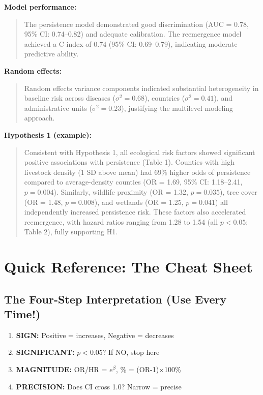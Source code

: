 \documentclass[11pt,a4paper]{article}
\begin{document}
\textbf{Model performance:}
\begin{quote}
The persistence model demonstrated good discrimination (AUC = 0.78, 95\% CI: 0.74--0.82) and adequate calibration. The reemergence model achieved a C-index of 0.74 (95\% CI: 0.69--0.79), indicating moderate predictive ability.
\end{quote}

\textbf{Random effects:}
\begin{quote}
Random effects variance components indicated substantial heterogeneity in baseline risk across diseases ($\sigma^2 = 0.68$), countries ($\sigma^2 = 0.41$), and administrative units ($\sigma^2 = 0.23$), justifying the multilevel modeling approach.
\end{quote}

\textbf{Hypothesis 1 (example):}
\begin{quote}
Consistent with Hypothesis 1, all ecological risk factors showed significant positive associations with persistence (Table 1). Counties with high livestock density (1 SD above mean) had 69\% higher odds of persistence compared to average-density counties (OR = 1.69, 95\% CI: 1.18--2.41, $p = 0.004$). Similarly, wildlife proximity (OR = 1.32, $p = 0.035$), tree cover (OR = 1.48, $p = 0.008$), and wetlands (OR = 1.25, $p = 0.041$) all independently increased persistence risk. These factors also accelerated reemergence, with hazard ratios ranging from 1.28 to 1.54 (all $p < 0.05$; Table 2), fully supporting H1.
\end{quote}

\section{Quick Reference: The Cheat Sheet}

\subsection{The Four-Step Interpretation (Use Every Time!)}

\begin{enumerate}
    \item \textbf{SIGN:} Positive = increases, Negative = decreases
    \item \textbf{SIGNIFICANT:} $p < 0.05$? If NO, stop here
    \item \textbf{MAGNITUDE:} OR/HR = $e^\beta$, \% = (OR-1)$\times$100\%
    \item \textbf{PRECISION:} Does CI cross 1.0? Narrow = precise
\end{enumerate}
\end{document}
